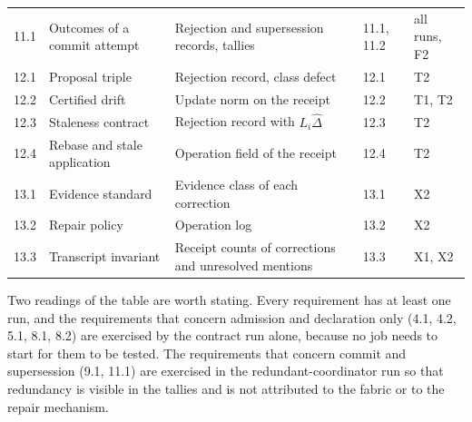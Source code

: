 \documentclass[11pt,openany]{book}
\theoremstyle{remark}
\begin{document}
{\begin{longtable}{@{}P{0.07\textwidth}P{0.25\textwidth}P{0.28\textwidth}P{0.14\textwidth}P{0.14\textwidth}@{}}
11.1 & Outcomes of a commit attempt & Rejection and supersession records, tallies & 11.1, 11.2 & all runs, F2 \\
12.1 & Proposal triple & Rejection record, class defect & 12.1 & T2 \\
12.2 & Certified drift & Update norm on the receipt & 12.2 & T1, T2 \\
12.3 & Staleness contract & Rejection record with $L_i\hat\Delta$ & 12.3 & T2 \\
12.4 & Rebase and stale application & Operation field of the receipt & 12.4 & T2 \\
13.1 & Evidence standard & Evidence class of each correction & 13.1 & X2 \\
13.2 & Repair policy & Operation log & 13.2 & X2 \\
13.3 & Transcript invariant & Receipt counts of corrections and unresolved mentions & 13.3 & X1, X2 \\
\bottomrule
\end{longtable}
}

Two readings of the table are worth stating. Every requirement has at least one run, and the requirements that concern admission and declaration only (4.1, 4.2, 5.1, 8.1, 8.2) are exercised by the contract run alone, because no job needs to start for them to be tested. The requirements that concern commit and supersession (9.1, 11.1) are exercised in the redundant-coordinator run so that redundancy is visible in the tallies and is not attributed to the fabric or to the repair mechanism.
\end{document}

